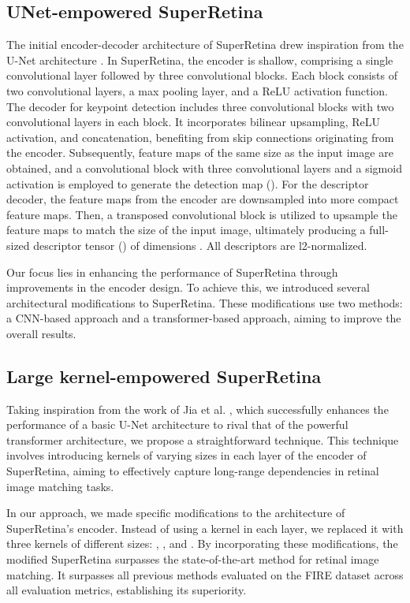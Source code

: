 \documentclass[10pt,twocolumn,letterpaper]{article}
\begin{document}
\subsection{UNet-empowered SuperRetina}
The initial encoder-decoder architecture of SuperRetina drew inspiration from the U-Net architecture \cite{ronneberger2015u}. In SuperRetina, the encoder is shallow, comprising a single convolutional layer followed by three convolutional blocks. Each block consists of two convolutional layers, a  max pooling layer, and a ReLU activation function. The decoder for keypoint detection includes three convolutional blocks with two convolutional layers in each block. It incorporates bilinear upsampling, ReLU activation, and concatenation, benefiting from skip connections originating from the encoder. Subsequently, feature maps of the same size as the input image are obtained, and a convolutional block with three convolutional layers and a sigmoid activation is employed to generate the detection map (). 
For the descriptor decoder, the feature maps from the encoder are downsampled into more compact  feature maps. Then, a transposed convolutional block is utilized to upsample the feature maps to match the size of the input image, ultimately producing a full-sized descriptor tensor () of dimensions . All descriptors are l2-normalized.

Our focus lies in enhancing the performance of SuperRetina through improvements in the encoder design. To achieve this, we introduced several architectural modifications to SuperRetina. These modifications use two methods: a CNN-based approach and a transformer-based approach, aiming to improve the overall results.

\subsection{Large kernel-empowered SuperRetina}
Taking inspiration from the work of Jia et al. \cite{jia2022u}, which successfully enhances the performance of a basic U-Net architecture to rival that of the powerful transformer architecture, we propose a straightforward technique. This technique involves introducing kernels of varying sizes in each layer of the encoder of SuperRetina, aiming to effectively capture long-range dependencies in retinal image matching tasks.

In our approach, we made specific modifications to the architecture of SuperRetina's encoder. Instead of using a  kernel in each layer, we replaced it with three kernels of different sizes: , , and . By incorporating these modifications, the modified SuperRetina surpasses the state-of-the-art method for retinal image matching. It surpasses all previous methods evaluated on the FIRE dataset across all evaluation metrics, establishing its superiority.
\end{document}

